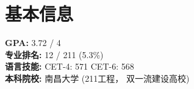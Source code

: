 \documentclass{resume}
\begin{document}









\section{基本信息}
\textbf{GPA: } 3.72 / 4 \\
\textbf{专业排名: } 12 / 211 (5.3\%)  \\
\textbf{语言技能: } CET-4: 571 \quad CET-6: 568 \\
\textbf{本科院校: } 南昌大学 (211工程， 双一流建设高校) 

\end{document}
